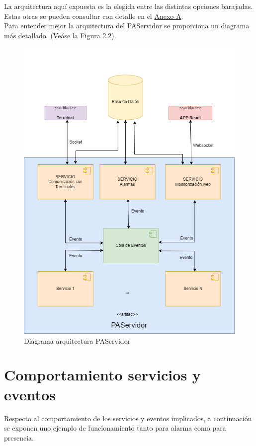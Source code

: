 La arquitectura aquí expuesta es la elegida entre las distintas opciones barajadas. Estas otras se pueden consultar con detalle en el \hyperref[anexo-a]{Anexo A}.\\

Para entender mejor la arquitectura del PAServidor se proporciona un diagrama más detallado. (Veáse la Figura 2.2).

\begin{figure}[H]
    \centering
    \includegraphics[width=12cm]{Imagenes/Arquitectura-PAServidor}
    \caption{Diagrama arquitectura PAServidor}
    \label{fig:PAServidor}
\end{figure}


\section{Comportamiento servicios y eventos}
Respecto al comportamiento de los servicios y eventos implicados, a continuación se exponen uno ejemplo de funcionamiento tanto para alarma como para presencia.\\

